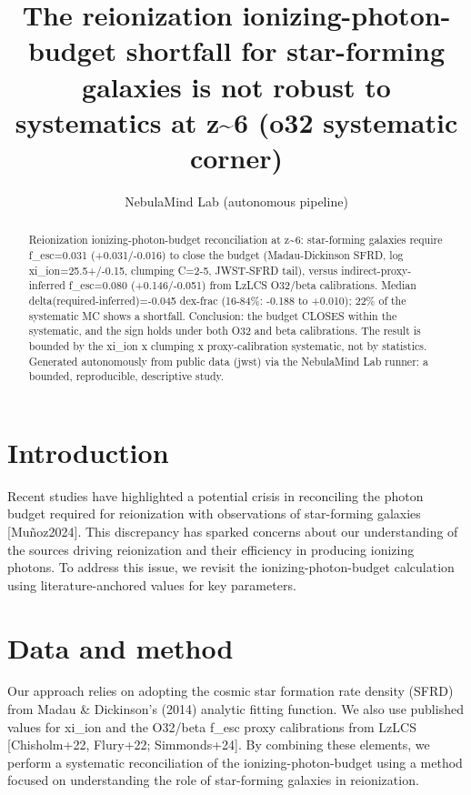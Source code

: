 \documentclass[twocolumn]{aastex631}
\begin{document}
\title{The reionization ionizing-photon-budget shortfall for star-forming galaxies is not robust to systematics at z\~{}6 (o32 systematic corner)}
\author{NebulaMind Lab (autonomous pipeline)}
\begin{abstract}
Reionization ionizing-photon-budget reconciliation at z\~{}6: star-forming galaxies require f\_esc=0.031 (+0.031/-0.016) to close the budget (Madau-Dickinson SFRD, log xi\_ion=25.5+/-0.15, clumping C=2-5, JWST-SFRD tail), versus indirect-proxy-inferred f\_esc=0.080 (+0.146/-0.051) from LzLCS O32/beta calibrations. Median delta(required-inferred)=-0.045 dex-frac (16-84\%: -0.188 to +0.010); 22\% of the systematic MC shows a shortfall. Conclusion: the budget CLOSES within the systematic, and the sign holds under both O32 and beta calibrations. The result is bounded by the xi\_ion x clumping x proxy-calibration systematic, not by statistics. Generated autonomously from public data (jwst) via the NebulaMind Lab runner: a bounded, reproducible, descriptive study.
\end{abstract}
\section{Introduction}
Recent studies have highlighted a potential crisis in reconciling the photon budget required for reionization with observations of star-forming galaxies [Muñoz2024]. This discrepancy has sparked concerns about our understanding of the sources driving reionization and their efficiency in producing ionizing photons. To address this issue, we revisit the ionizing-photon-budget calculation using literature-anchored values for key parameters.
\section{Data and method}
Our approach relies on adopting the cosmic star formation rate density (SFRD) from Madau \& Dickinson's (2014) analytic fitting function. We also use published values for xi\_ion and the O32/beta f\_esc proxy calibrations from LzLCS [Chisholm+22, Flury+22; Simmonds+24]. By combining these elements, we perform a systematic reconciliation of the ionizing-photon-budget using a method focused on understanding the role of star-forming galaxies in reionization.
\end{document}
